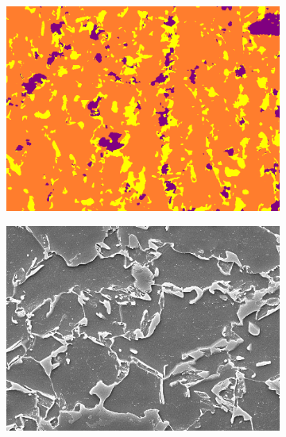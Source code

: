 \documentclass[]{article}
\begin{document}
\begin{figure}[ht]
\begin{subfigure}[b]{0.3\textwidth}
		\caption{}
		\label{fig:samesteeldiffmag3K-label}
	\end{subfigure}
	\hfill
	\begin{subfigure}[b]{0.3\textwidth}
		\centering
		\includegraphics[width=\textwidth]{images/inference/SameSteelDiffMag-P.png}
		\caption{}
		\label{fig:samesteeldiffmag3K-pred}
	\end{subfigure}
		\begin{subfigure}[b]{0.3\textwidth}
		\centering
		\includegraphics[width=\textwidth]{images/inference/SameSteelDiffMag-2-O.jpg}
		\caption{}
		\label{fig:samesteeldiffmag5K-orig}
	\end{subfigure}
	\hfill
	\begin{subfigure}[b]{0.3\textwidth}

\end{subfigure}
\end{figure}
\end{document}
